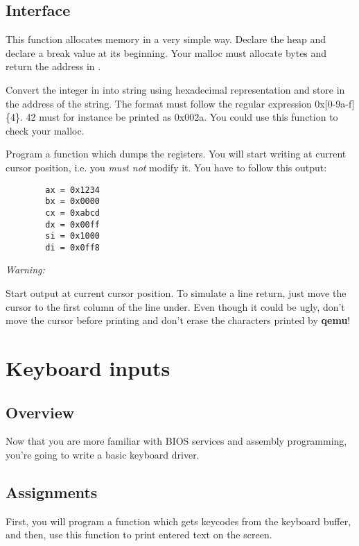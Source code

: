 \subsection*{Interface}
{
  This function allocates memory in a very simple way. Declare the heap and
  declare a break value at its beginning.
  Your malloc must allocate  bytes and return the address
  in .
}

{
  Convert the integer in  into string using hexadecimal
  representation and store in  the address of the string.
  The format must follow the regular expression 0x[0-9a-f]\{4\}.
  42 must for instance be printed as 0x002a. You could use this function
  to check your malloc.
}

{
  Program a function which dumps the registers. You will start writing
  at current cursor position, i.e. you \emph{must not} modify it. You have to
  follow this output:
}
\begin{verbatim}
        ax = 0x1234
        bx = 0x0000
        cx = 0xabcd
        dx = 0x00ff
        si = 0x1000
        di = 0x0ff8
\end{verbatim}

\function{}{}
{
  {\em Warning:}

  Start output at current cursor position. To simulate a line return, just move
  the cursor to the first column of the line under. Even though it could be
  ugly, don't move the cursor before printing and don't erase the characters
  printed by \textbf{qemu}!
}

%
%

\newpage

\section{Keyboard inputs}

\subsection*{Overview}
Now that you are more familiar with BIOS services and assembly programming,
you're going to write a basic keyboard driver.

\subsection*{Assignments}
First, you will program a function which gets keycodes from the keyboard
buffer, and then, use this function to print entered text on the screen.

